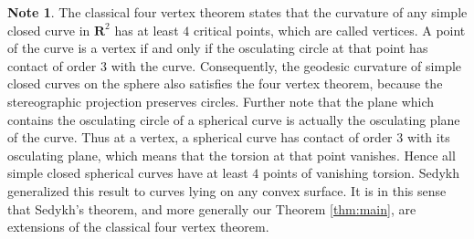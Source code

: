 \documentclass[11pt]{amsart}
\theoremstyle{definition}
\newtheorem{note}[thm]{Note}
\newcommand{\R}{\mathbf{R}}
\renewcommand{\(}{\left(}
\renewcommand{\)}{\right)}
\begin{document}
\begin{note}\label{note:4vertex}
The classical four vertex theorem  states that the curvature of any simple closed curve in $\R^2$ has at least $4$ critical points, which are called vertices.  A point of the curve is a vertex if and only if the osculating circle at that point has contact of order $3$ with the curve. Consequently, the geodesic curvature of simple closed curves on the sphere also satisfies the four vertex theorem, because the stereographic projection preserves circles. Further note that the plane which contains the osculating circle of a spherical curve is actually the osculating plane of the curve. Thus at a vertex, a spherical curve has contact of order $3$ with its osculating plane, which means that the torsion at that point vanishes. Hence all simple closed spherical curves have at least $4$ points of vanishing torsion. Sedykh generalized this result to curves lying on any convex surface. It is in this sense that Sedykh's theorem, and more generally our Theorem \ref{thm:main}, are extensions of the classical four vertex theorem.
\end{note}
\end{document}
